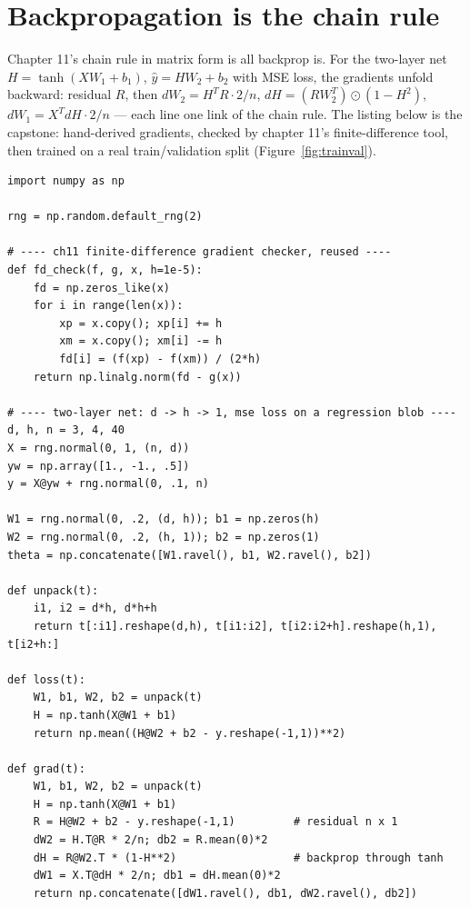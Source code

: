 \section{Backpropagation is the chain rule}\label{sec:opt-backprop}

Chapter 11's chain rule in matrix form is all backprop is. For the
two-layer net $H=\tanh(XW_1+b_1)$, $\hat y=HW_2+b_2$ with MSE loss,
the gradients unfold backward: residual $R$, then
$dW_2=H^TR\cdot 2/n$, $dH=(RW_2^T)\odot(1-H^2)$,
$dW_1=X^TdH\cdot 2/n$ --- each line one link of the chain rule. The
listing below is the capstone: hand-derived gradients, checked by
chapter 11's finite-difference tool, then trained on a real
train/validation split (Figure~\ref{fig:trainval}).

\begin{lstlisting}[caption={\ttfamily code/ch14\_tinynet.py ---
\texttt{mlscratch.TinyNet}: two-layer net with hand-derived backprop,
gradient-checked, and compared against a library MLP.}]
import numpy as np

rng = np.random.default_rng(2)

# ---- ch11 finite-difference gradient checker, reused ----
def fd_check(f, g, x, h=1e-5):
    fd = np.zeros_like(x)
    for i in range(len(x)):
        xp = x.copy(); xp[i] += h
        xm = x.copy(); xm[i] -= h
        fd[i] = (f(xp) - f(xm)) / (2*h)
    return np.linalg.norm(fd - g(x))

# ---- two-layer net: d -> h -> 1, mse loss on a regression blob ----
d, h, n = 3, 4, 40
X = rng.normal(0, 1, (n, d))
yw = np.array([1., -1., .5])
y = X@yw + rng.normal(0, .1, n)

W1 = rng.normal(0, .2, (d, h)); b1 = np.zeros(h)
W2 = rng.normal(0, .2, (h, 1)); b2 = np.zeros(1)
theta = np.concatenate([W1.ravel(), b1, W2.ravel(), b2])

def unpack(t):
    i1, i2 = d*h, d*h+h
    return t[:i1].reshape(d,h), t[i1:i2], t[i2:i2+h].reshape(h,1), t[i2+h:]

def loss(t):
    W1, b1, W2, b2 = unpack(t)
    H = np.tanh(X@W1 + b1)
    return np.mean((H@W2 + b2 - y.reshape(-1,1))**2)

def grad(t):
    W1, b1, W2, b2 = unpack(t)
    H = np.tanh(X@W1 + b1)
    R = H@W2 + b2 - y.reshape(-1,1)         # residual n x 1
    dW2 = H.T@R * 2/n; db2 = R.mean(0)*2
    dH = R@W2.T * (1-H**2)                  # backprop through tanh
    dW1 = X.T@dH * 2/n; db1 = dH.mean(0)*2
    return np.concatenate([dW1.ravel(), db1, dW2.ravel(), db2])


\end{lstlisting}
